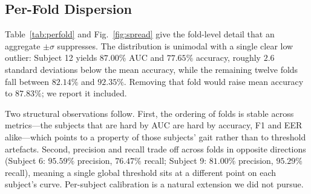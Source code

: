 \documentclass[journal]{IEEEtran}
\begin{document}
\subsection{Per-Fold Dispersion}
\label{sec:perfold}

Table~\ref{tab:perfold} and Fig.~\ref{fig:spread} give the fold-level detail
that an aggregate $\pm\sigma$ suppresses. The distribution is unimodal with a
single clear low outlier: Subject 12 yields $87.00\%$ AUC and $77.65\%$
accuracy, roughly $2.6$ standard deviations below the mean accuracy, while the
remaining twelve folds fall between $82.14\%$ and $92.35\%$. Removing that fold
would raise mean accuracy to $87.83\%$; we report it included.

Two structural observations follow. First, the ordering of folds is stable
across metrics---the subjects that are hard by AUC are hard by accuracy, F1 and
EER alike---which points to a property of those subjects' gait rather than to
threshold artefacts. Second, precision and recall trade off across folds in
opposite directions (Subject 6: $95.59\%$ precision, $76.47\%$ recall; Subject 9:
$81.00\%$ precision, $95.29\%$ recall), meaning a single global threshold sits
at a different point on each subject's curve. Per-subject calibration is a
natural extension we did not pursue.
\end{document}
